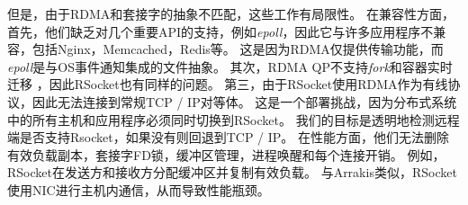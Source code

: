 但是，由于RDMA和套接字的抽象不匹配，这些工作有局限性。
在兼容性方面，首先，他们缺乏对几个重要API的支持，例如\textit {epoll}，因此它与许多应用程序不兼容，包括Nginx，Memcached，Redis等。
这是因为RDMA仅提供传输功能，而\textit {epoll}是与OS事件通知集成的文件抽象。
其次，RDMA QP不支持\textit {fork}和容器实时迁移 \cite{nsdi19freeflow}，因此RSocket也有同样的问题。
第三，由于RSocket使用RDMA作为有线协议，因此无法连接到常规TCP / IP对等体。
这是一个部署挑战，因为分布式系统中的所有主机和应用程序必须同时切换到RSocket。
我们的目标是透明地检测远程端是否支持Rsocket，如果没有则回退到TCP / IP。
在性能方面，他们无法删除有效负载副本，套接字FD锁，缓冲区管理，进程唤醒和每个连接开销。
例如，RSocket在发送方和接收方分配缓冲区并复制有效负载。
与Arrakis类似，RSocket使用NIC进行主机内通信，从而导致性能瓶颈。





